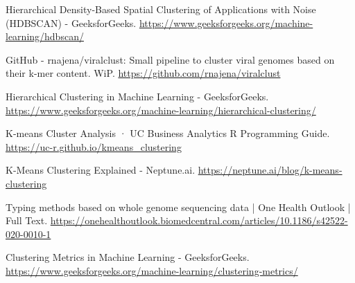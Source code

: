 \documentclass[a4paper,12pt]{article}
\begin{document}
\newpage
\begin{thebibliography}{99}

Hierarchical Density-Based Spatial Clustering of Applications with Noise (HDBSCAN) - GeeksforGeeks.  
\url{https://www.geeksforgeeks.org/machine-learning/hdbscan/}

GitHub - rnajena/viralclust: Small pipeline to cluster viral genomes based on their k-mer content. WiP.  
\url{https://github.com/rnajena/viralclust}

Hierarchical Clustering in Machine Learning - GeeksforGeeks.  
\url{https://www.geeksforgeeks.org/machine-learning/hierarchical-clustering/}

K-means Cluster Analysis · UC Business Analytics R Programming Guide.  
\url{https://uc-r.github.io/kmeans_clustering}

K-Means Clustering Explained - Neptune.ai.  
\url{https://neptune.ai/blog/k-means-clustering}

Typing methods based on whole genome sequencing data | One Health Outlook | Full Text.  
\url{https://onehealthoutlook.biomedcentral.com/articles/10.1186/s42522-020-0010-1}

Clustering Metrics in Machine Learning - GeeksforGeeks.  
\url{https://www.geeksforgeeks.org/machine-learning/clustering-metrics/}

\end{thebibliography}
\end{document}
